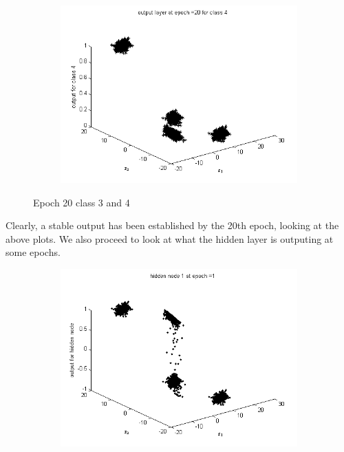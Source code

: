 \documentclass{article}
\begin{document}
\begin{flushleft}
\begin{figure}
\begin{subfigure}{.5\textwidth}
\end{subfigure}%
\begin{subfigure}{.5\textwidth}
  \centering
  \includegraphics[width=.8\linewidth]{Classification/linearlySeparable/20_4}
  
\end{subfigure}
\caption{Epoch 20 class 3 and 4}
\end{figure}
Clearly, a stable output has been established by the 20th epoch, looking at the above plots. We also proceed to look at what the hidden layer is outputing at some epochs. \\[10pt]
\begin{figure}
\begin{subfigure}{.3\textwidth}
  \centering
  \includegraphics[width=.8\linewidth]{Classification/linearlySeparable/h1_1}
 

\end{subfigure}
\end{figure}
\end{flushleft}
\end{document}

